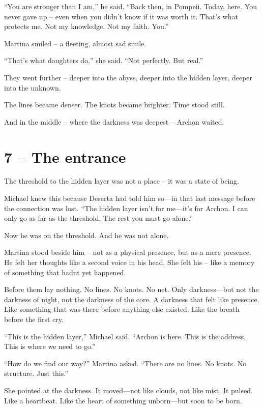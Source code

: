 \documentclass[
]{article}
\begin{document}
``You are stronger than I am,'' he said. ``Back then, in Pompeii. Today, here. You never gave up -- even when you didn't know if it was worth it. That's what protects me. Not my knowledge. Not my faith. You.''

Martina smiled -- a fleeting, almost sad smile.

``That's what daughters do,'' she said. ``Not perfectly. But real.''

They went further -- deeper into the abyss, deeper into the hidden layer, deeper into the unknown.

The lines became denser. The knots became brighter. Time stood still.

And in the middle -- where the darkness was deepest -- Archon waited.

\section{7 -- The entrance}\label{the-entrance}

The threshold to the hidden layer was not a place -- it was a state of being.

Michael knew this because Deserta had told him so---in that last message before the connection was lost. ``The hidden layer isn't for me---it's for Archon. I can only go as far as the threshold. The rest you must go alone.''

Now he was on the threshold. And he was not alone.

Martina stood beside him -- not as a physical presence, but as a mere presence. He felt her thoughts like a second voice in his head. She felt his -- like a memory of something that hadn\textquotesingle t yet happened.

Before them lay nothing. No lines. No knots. No net. Only darkness---but not the darkness of night, not the darkness of the core. A darkness that felt like presence. Like something that was there before anything else existed. Like the breath before the first cry.

``This is the hidden layer,'' Michael said. ``Archon is here. This is the address. This is where we need to go.''

``How do we find our way?'' Martina asked. ``There are no lines. No knots. No structure. Just this.''

She pointed at the darkness. It moved---not like clouds, not like mist. It pulsed. Like a heartbeat. Like the heart of something unborn---but soon to be born.
\end{document}
